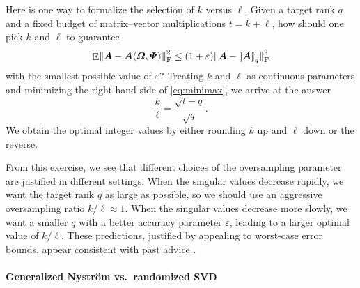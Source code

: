 \documentclass[11pt]{article}
\newcommand{\mat}[1]{\boldsymbol{#1}}
\newcommand{\lowrank}[1]{%
  \mleft[\!\mleft[ #1 \mright]\!\mright]}
\newcommand{\norm}[1]{\mleft\| #1 \mright\|}
\DeclareMathOperator{\expect}{\mathbb{E}}
\theoremstyle{definition}
\numberwithin{equation}{section}
\begin{document}
Here is one way to formalize the selection of $k$ versus $\ell$. Given a target rank $q$ and a fixed budget of matrix--vector multiplications $t = k + \ell$, how should one pick $k$ and $\ell$ to guarantee
%
\begin{equation*}
    \expect \norm{\mat{A} - \mat{A}\langle\mat{\varOmega},\mat{\varPsi}\rangle}_{\rm F}^2
    \leq (1 + \varepsilon) \norm{\smash{\mat{A} - \lowrank{\mat{A}}_q}}_{\rm F}^2
\end{equation*}
%
with the smallest possible value of $\varepsilon$?
Treating $k$ and $\ell$ as continuous parameters and minimizing the right-hand side of \cref{eq:minimax}, we arrive at the answer
%
\begin{equation}
\label{eq:ratio}
    \frac{k}{\ell} = \frac{\sqrt{t - q}}{\sqrt{q}}.
\end{equation}
%
We obtain the optimal integer values by either rounding $k$ up and $\ell$ down or the reverse.

From this exercise, we see that different choices of the oversampling parameter are justified in different settings.
When the singular values decrease rapidly, we want the target rank $q$ as large as possible, so we should use an aggressive oversampling ratio $k/\ell \approx 1$.
When the singular values decrease more slowly, we want a smaller $q$ with a better accuracy parameter $\varepsilon$, leading to a larger optimal value of $k/\ell$.
These predictions, justified by appealing to worst-case error bounds, appear consistent with past advice \cite{TYUC17}.

\paragraph{Generalized Nystr\"om vs.\ randomized SVD}
\end{document}
